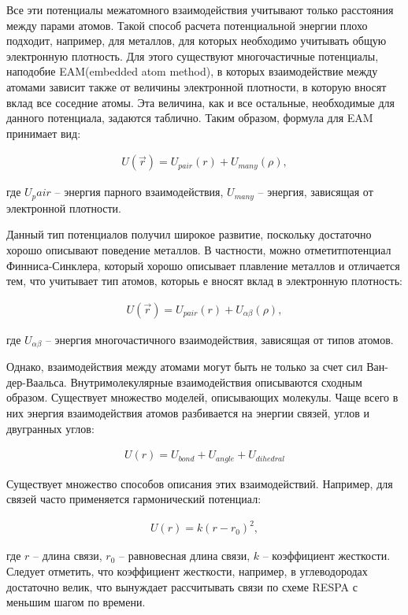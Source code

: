 Все эти потенциалы межатомного взаимодействия учитывают только расстояния между парами атомов. Такой способ расчета потенциальной энергии плохо подходит, например, для металлов, для которых необходимо учитывать общую электронную плотность. Для этого существуют многочастичные потенциалы, наподобие EAM(embedded atom method), в которых взаимодействие между атомами зависит также от величины электронной плотности, в которую вносят вклад все соседние атомы. Эта величина, как и все остальные, необходимые для данного потенциала, задаются таблично. Таким образом, формула для EAM принимает вид:

\begin{align}
	U(\overrightarrow{r}) = U_{pair}(r) + U_{many}(\rho),
\end{align}

где $U_pair$ \--- энергия парного взаимодействия, $U_{many}$ \--- энергия, зависящая от электронной плотности.

Данный тип потенциалов получил широкое развитие, поскольку достаточно хорошо описывают поведение металлов. В частности, можно отметитпотенциал Финниса-Синклера, который хорошо описывает плавление металлов и отличается тем, что учитывает тип атомов, которыь е вносят вклад в электронную плотность:

\begin{align}
	U(\overrightarrow{r}) = U_{pair}(r) + U_{\alpha \beta}(\rho),
\end{align}

где $U_{\alpha \beta}$ \--- энергия многочастичного взаимодействия, зависящая от типов атомов.

Однако, взаимодействия между атомами могут быть не только за счет сил Ван-дер-Ваальса. Внутримолекулярные взаимодействия описываются сходным образом. Существует множество моделей, описывающих молекулы. Чаще всего в них энергия взаимодействия  атомов разбивается на энергии связей, углов и двугранных углов:

\begin{align}
	U(r) = U_{bond} + U_{angle} + U_{dihedral}
\end{align}

Существует множество способов описания этих взаимодействий. Например, для связей часто применяется гармонический потенциал:

\begin{align}
	U(r) = k (r - r_0)^2,
\end{align}

где $r$ \--- длина связи, $r_0$ \--- равновесная длина связи, $k$ \--- коэффициент жесткости. Следует отметить, что коэффициент жесткости, например, в углеводородах достаточно велик, что вынуждает рассчитывать связи по схеме RESPA с меньшим шагом по времени.

